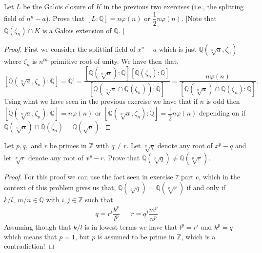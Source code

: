 \documentclass[11pt]{article}
\newenvironment{problem}[2][Problem\!]{\begin{tcolorbox}\begin{trivlist}
\item[\hskip \labelsep {\bfseries #1}\hskip \labelsep {\bfseries #2}]}{\end{trivlist}\end{tcolorbox}}
\newcommand{\zz}{\mathbb Z}   %
\newcommand{\qq}{\mathbb Q}   %
\renewcommand{\phi}{\varphi}
\begin{document}
\vspace*{15pt}
\newpage
\begin{problem} {14.7.6}
    Let $L$ be the Galois closure of $K$ in the previous two exercises (i.e., the splitting field of $n^{n} -a$). Prove that $[L: \qq] = n\phi(n)$ or $\dfrac{1}{2}n\phi(n)$. [Note that $\qq(\zeta_n)\cap K$ is a Galois extension of $\qq$. ]
\end{problem}
\begin{proof}
    First we consider the splittinf field of $x^{n}- a$ which is just $\qq(\sqrt[n]{a}, \zeta_n)$ where $\zeta_n$ is $n^{th}$ primitive root of unity. We have then that,
    \[[\qq(\sqrt[n]{a}, \zeta_n):\qq] = \qq] = \dfrac{[\qq(\sqrt[n]{a}): \qq][\qq(\zeta_n):\qq]}{[\qq(\sqrt[n]{a}\cap\qq(\zeta_n)): \qq]} = \dfrac{n\phi(n)}{[\qq(\sqrt[n]{a})\cap\qq(\zeta_n):\qq]}.\]
    Using what we have seen in the previous exercise we have that if $n$ is odd then $[\qq(\sqrt[n]{a}, \zeta_n):\qq] = n\phi(n)$ or $[\qq(\sqrt[n]{a},\zeta_n):\qq ] = \dfrac{1}{2}n\phi(n)$ depending on if $\qq(\sqrt[n]{a})\cap\qq(\zeta_n) = \qq(\sqrt{a})$.  
\end{proof}

\vspace*{15pt}

\begin{problem} {14.7.8}
    Let $p, q,$ and $r$ be primes in $\zz$ with $q \neq r$. Let $\sqrt[p]{q}$ denote any root of $x^{p} - q$ and let $\sqrt[p]{r}$ denote any root of $x^{p} - r$. Prove that $\qq(\sqrt[p]{q}) \neq \qq(\sqrt[p]{r})$. 
\end{problem}
\begin{proof}
    For this proof we can use the fact seen in exercise 7 part c, which in the context of this problem gives us that, $\qq(\sqrt[p]{q}) = \qq(\sqrt[p]{r})$ if and only if $k/l, \ m/n \in \qq$ with $i,j \in \zz$ such that
    \begin{align*}
        q = r^{i}\dfrac{k^{p}}{l^{p}} && r = q^{j}\dfrac{m^{p}}{n^{p}}
    \end{align*}
    Assuming though that $k/l$ is in lowest terms we have that $l^{p} = r^{i}$ and $k^{p} = q$ which means that $p =1$, but $p$ is assumed to be prime in $\zz$, which is a contradiction!
\end{proof}

\vspace*{15pt}
\end{document}
